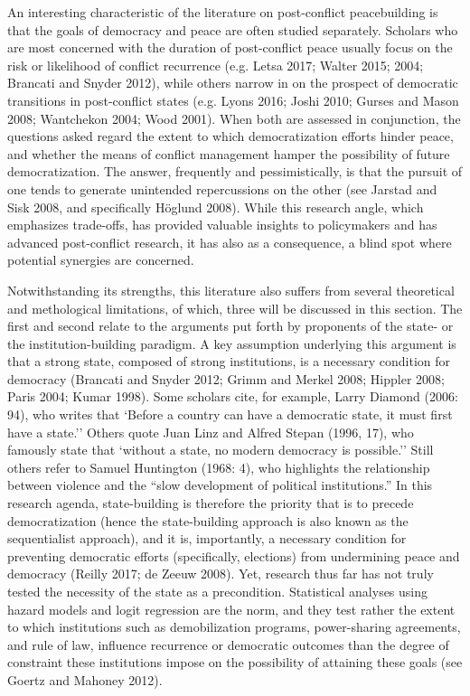 \documentclass [11pt]{article}
\begin{document}
An interesting characteristic of the literature on post-conflict peacebuilding is that the goals of democracy and peace are often studied separately. Scholars who are most concerned with the duration of post-conflict peace usually focus on the risk or likelihood of conflict recurrence (e.g. Letsa 2017; Walter 2015; 2004; Brancati and Snyder 2012), while others narrow in on the prospect of democratic transitions in post-conflict states (e.g. Lyons 2016; Joshi 2010; Gurses and Mason 2008; Wantchekon 2004; Wood 2001). When both are assessed in conjunction, the questions asked regard the extent to which democratization efforts hinder peace, and whether the means of conflict management hamper the possibility of future democratization. The answer, frequently and pessimistically, is that the pursuit of one tends to generate unintended repercussions on the other (see Jarstad and Sisk 2008, and specifically Höglund 2008). While this research angle, which emphasizes trade-offs, has provided valuable insights to policymakers and has advanced post-conflict research, it has also as a consequence, a blind spot where potential synergies are concerned.

Notwithstanding its strengths, this literature also suffers from several theoretical and methological limitations, of which, three will be discussed in this section. The first and second relate to the arguments put forth by proponents of the state- or the institution-building paradigm. A key assumption underlying this argument is that a strong state, composed of strong institutions, is a necessary condition for democracy (Brancati and Snyder 2012; Grimm and Merkel 2008; Hippler 2008; Paris 2004; Kumar 1998). Some scholars cite, for example, Larry Diamond (2006: 94), who writes that `Before a country can have a democratic state, it must first have a state.'' Others quote Juan Linz and Alfred Stepan (1996, 17), who famously state that `without a state, no modern democracy is possible.'' Still others refer to Samuel Huntington (1968: 4), who highlights the relationship between violence and the ``slow development of political institutions.'' In this research agenda, state-building is therefore the priority that is to precede democratization (hence the state-building approach is also known as the sequentialist approach), and it is, importantly, a necessary condition for preventing democratic efforts (specifically, elections) from undermining peace and democracy (Reilly 2017; de Zeeuw 2008). Yet, research thus far has not truly tested the necessity of the state as a precondition. Statistical analyses using hazard models and logit regression are the norm, and they test rather the extent to which institutions such as demobilization programs, power-sharing agreements, and rule of law, influence recurrence or democratic outcomes than the degree of constraint these institutions impose on the possibility of attaining these goals (see Goertz and Mahoney 2012).
\end{document}
